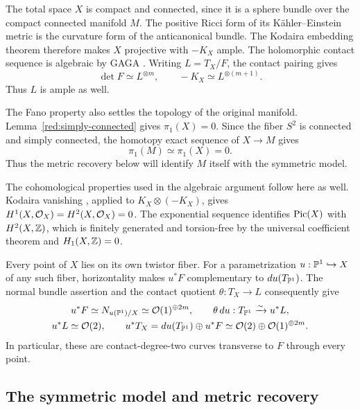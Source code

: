 The total space $X$ is compact and connected, since it is a sphere
bundle over the compact connected manifold $M$.
The positive Ricci form of its K\"ahler--Einstein metric is the
curvature form of the anticanonical bundle. The Kodaira embedding
theorem \cite{Kodaira1954} therefore makes $X$ projective with
$-K_X$ ample. The holomorphic contact sequence is algebraic by
GAGA \cite{Serre1956}. Writing $L=T_X/F$, the contact pairing gives
\begin{equation}\label{tw:determinants}
\det F\simeq L^{\otimes m},
\qquad -K_X\simeq L^{\otimes(m+1)}.
\end{equation}
Thus $L$ is ample as well.

The Fano property also settles the topology of the original manifold.
Lemma~\ref{red:simply-connected} gives $\pi_1(X)=0$. Since the fiber
$S^2$ is connected and simply connected, the homotopy exact sequence of
$X\to M$ gives
\[
\pi_1(M)\simeq\pi_1(X)=0.
\]
Thus the metric recovery below will identify $M$ itself with the
symmetric model.

The cohomological properties used in the algebraic argument follow here
as well. Kodaira vanishing
\cite{Kodaira1953}, applied to $K_X\otimes(-K_X)$, gives
$H^1(X,\mathcal O_X)=H^2(X,\mathcal O_X)=0$. The exponential sequence identifies
$\operatorname{Pic}(X)$ with $H^2(X,\mathbb Z)$, which is finitely generated and
torsion-free by the universal coefficient theorem and
$H_1(X,\mathbb Z)=0$.

Every point of $X$ lies on its own twistor fiber. For a parametrization
$u:\mathbb P^1\hookrightarrow X$ of any such fiber, horizontality makes
$u^*F$ complementary to $du(T_{\mathbb P^1})$. The normal bundle assertion
and the contact quotient $\theta:T_X\to L$ consequently give
\begin{equation}\label{tw:fiber-splitting}
\begin{gathered}
u^*F\simeq N_{u(\mathbb P^1)/X}\simeq\mathcal O(1)^{\oplus2m},
\qquad
\theta\,du:T_{\mathbb P^1}\xrightarrow{\sim}u^*L,\\
u^*L\simeq\mathcal O(2),\qquad
u^*T_X=du(T_{\mathbb P^1})\oplus u^*F
\simeq\mathcal O(2)\oplus\mathcal O(1)^{\oplus2m}.
\end{gathered}
\end{equation}
In particular, these are contact-degree-two curves transverse to $F$
through every point.

\subsection{The symmetric model and metric recovery}

